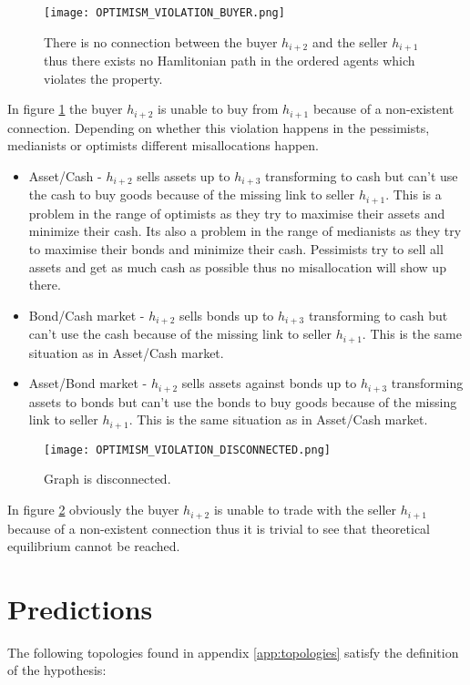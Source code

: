 \documentclass[Bachelorarbeit.tex]{subfiles}
\begin{document}
\begin{figure}[H]
	\centering
  \texttt{[image: OPTIMISM\_VIOLATION\_BUYER.png]}
  	\caption{There is no connection between the buyer $h_{i+2}$ and the seller $h_{i+1}$ thus there exists no Hamlitonian path in the ordered agents which violates the property.}
	\label{fig:OPTIMISM_VIOLATION_BUYER}
\end{figure}

In figure \ref{fig:OPTIMISM_VIOLATION_BUYER} the buyer $h_{i+2}$ is unable to buy from $h_{i+1}$ because of a non-existent connection. Depending on whether this violation happens in the pessimists, medianists or optimists different misallocations happen.

\begin{itemize}
\item Asset/Cash - $h_{i+2}$ sells assets up to $h_{i+3}$ transforming to cash but can't use the cash to buy goods because of the missing link to seller $h_{i+1}$. This is a problem in the range of optimists as they try to maximise their assets and minimize their cash. Its also a problem in the range of medianists as they try to maximise their bonds and minimize their cash. Pessimists try to sell all assets and get as much cash as possible thus no misallocation will show up there.
\item Bond/Cash market - $h_{i+2}$ sells bonds up to $h_{i+3}$ transforming to cash but can't use the cash because of the missing link to seller $h_{i+1}$. This is the same situation as in Asset/Cash market.
\item Asset/Bond market - $h_{i+2}$ sells assets against bonds up to $h_{i+3}$ transforming assets to bonds but can't use the bonds to buy goods because of the missing link to seller $h_{i+1}$. This is the same situation as in Asset/Cash market.
\end{itemize}

\begin{figure}[H]
	\centering
  \texttt{[image: OPTIMISM\_VIOLATION\_DISCONNECTED.png]}
  	\caption{Graph is disconnected.}
	\label{fig:OPTIMISM_VIOLATION_DISCONNECTED}
\end{figure}

In figure \ref{fig:OPTIMISM_VIOLATION_DISCONNECTED} obviously the buyer $h_{i+2}$ is unable to trade with the seller $h_{i+1}$ because of a non-existent connection thus it is trivial to see that theoretical equilibrium cannot be reached.

\section{Predictions}
The following topologies found in appendix \ref{app:topologies} satisfy the definition of the hypothesis:
\end{document}
